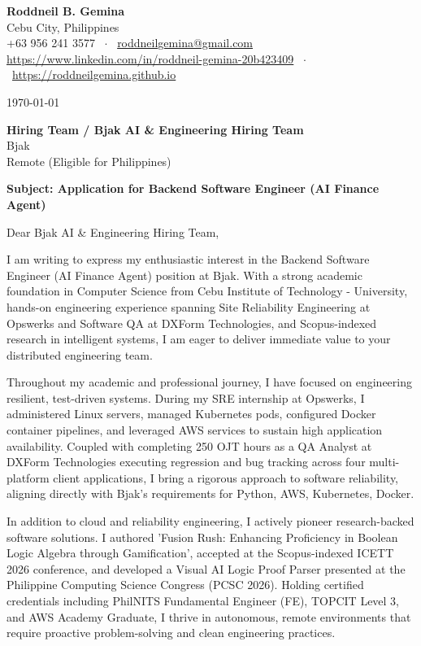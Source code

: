 \documentclass[letterpaper,11pt]{article}
\begin{document}
\textbf{Roddneil B. Gemina} \\
Cebu City, Philippines \\
+63 956 241 3577 \ $\cdot$ \ \href{mailto:roddneilgemina@gmail.com}{roddneilgemina@gmail.com} \\
\href{https://www.linkedin.com/in/roddneil-gemina-20b423409}{https://www.linkedin.com/in/roddneil-gemina-20b423409} \ $\cdot$ \ \href{https://roddneilgemina.github.io}{https://roddneilgemina.github.io}

\vspace{12pt}
\today

\vspace{8pt}
\textbf{Hiring Team / Bjak AI \& Engineering Hiring Team} \\
Bjak \\
Remote (Eligible for Philippines)

\vspace{8pt}
\textbf{Subject: Application for Backend Software Engineer (AI Finance Agent)}

\vspace{4pt}
Dear Bjak AI \& Engineering Hiring Team,

I am writing to express my enthusiastic interest in the Backend Software Engineer (AI Finance Agent) position at Bjak. With a strong academic foundation in Computer Science from Cebu Institute of Technology - University, hands-on engineering experience spanning Site Reliability Engineering at Opswerks and Software QA at DXForm Technologies, and Scopus-indexed research in intelligent systems, I am eager to deliver immediate value to your distributed engineering team.

Throughout my academic and professional journey, I have focused on engineering resilient, test-driven systems. During my SRE internship at Opswerks, I administered Linux servers, managed Kubernetes pods, configured Docker container pipelines, and leveraged AWS services to sustain high application availability. Coupled with completing 250 OJT hours as a QA Analyst at DXForm Technologies executing regression and bug tracking across four multi-platform client applications, I bring a rigorous approach to software reliability, aligning directly with Bjak's requirements for Python, AWS, Kubernetes, Docker.

In addition to cloud and reliability engineering, I actively pioneer research-backed software solutions. I authored 'Fusion Rush: Enhancing Proficiency in Boolean Logic Algebra through Gamification', accepted at the Scopus-indexed ICETT 2026 conference, and developed a Visual AI Logic Proof Parser presented at the Philippine Computing Science Congress (PCSC 2026). Holding certified credentials including PhilNITS Fundamental Engineer (FE), TOPCIT Level 3, and AWS Academy Graduate, I thrive in autonomous, remote environments that require proactive problem-solving and clean engineering practices.
\end{document}
